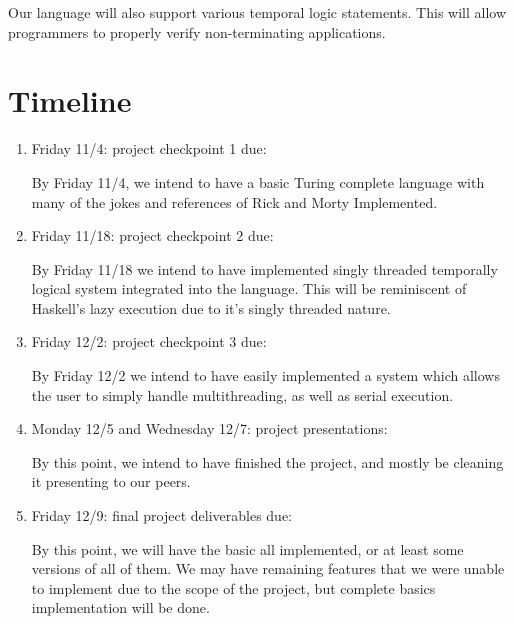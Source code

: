 \documentclass[numbers]{sigplanconf}
\begin{document}
Our language will also support various temporal logic statements. 
This will allow programmers to properly verify non-terminating applications. 
\section{Timeline}
\begin{enumerate}
\item    Friday 11/4: project checkpoint 1 due:

  By Friday 11/4, we intend to have a basic Turing complete language
  with many of the jokes and references of Rick and Morty Implemented.

\item  Friday 11/18: project checkpoint 2 due:

By Friday 11/18 we intend to have implemented singly threaded
temporally logical system integrated into the language. This will be 
reminiscent of Haskell's lazy execution due to it's singly threaded nature.

\item  Friday 12/2: project checkpoint 3 due:
  
  By Friday 12/2 we intend to have easily implemented a system which
  allows the user to simply handle multithreading, as well as serial execution.

\item  Monday 12/5 and Wednesday 12/7: project presentations:

By this point, we intend to have finished the project, and mostly be
cleaning it presenting to our peers.

\item Friday 12/9: final project deliverables due:

By this point, we will have the basic all implemented, or at least
some versions of all of them. We may have remaining features that we
were unable to implement due to the scope of the project, but complete
basics implementation will be done.
\end{enumerate}

\nocite{*}




{}
\end{document}
